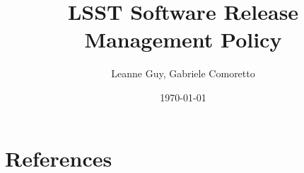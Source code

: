 \documentclass[DM,lsstdraft,toc]{lsstdoc}
\title{LSST Software Release Management Policy}
\author{%
Leanne Guy, Gabriele Comoretto
}
\date{\today}
\begin{document}
\maketitle



\newpage


\newpage


\appendix




\section{References} \label{sec:bib}


\printglossaries
\end{document}
